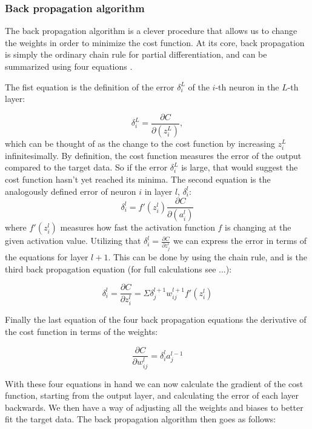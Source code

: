 \documentclass[a4paper, UKenglish, 11pt]{uiomaster}
\begin{document}
\subsubsection{Back propagation algorithm}
The back propagation algorithm is a clever procedure that allows us to change the weights in order to minimize the cost function. At its core, back propagation is simply the ordinary chain rule for partial differentiation, and can be summarized using four equations \cite{mehta2019high}.

The fist equation is the definition of the error $\delta_i^L$ of the $i$-th neuron in the $L$-th layer:

\begin{equation}
    \delta_i^L = \frac{\partial C}{\partial(z_i^L)},
\label{eq:I}
\end{equation}
which can be thought of as the change to the cost function by increasing $z_i^L$ infinitesimally. By definition, the cost function measures the error of the output compared to the target data. So if the error $\delta_i^L$ is large, that would suggest the cost function hasn't yet reached its minima.
The second equation is the analogously defined error of neuron $i$ in layer $l$, $\delta_i^l$:
\begin{equation}
    \delta_i^l = f'(z_i^l)\frac{\partial C}{\partial(a_i^l)}
\label{eq:II}
\end{equation}
where $f'(z_i^l)$ measures how fast the activation function $f$ is changing at the given activation value.
Utilizing that $\delta_i^l = \frac{\partial C}{\partial z_j^l}$ we can express the error in terms of the equations for layer $l+1$. This can be done by using the chain rule, and is the third back propagation equation (for full calculations see ...):

\begin{equation}
    \delta_i^l = \frac{\partial C}{\partial z^l_{i}} = \Sigma \delta_j^{l+1}w_{ij}^{l+1}f'(z_i^l)
\label{eq:III}
\end{equation}

Finally the last equation of the four back propagation equations the derivative of the cost function in terms of the weights:

\begin{equation}
    \frac{\partial C}{\partial w^l_{ij}} = \delta_i^l a_j^{l-1}
\label{eq:IV}
\end{equation}

With these four equations in hand we can now calculate the gradient of the cost function, starting from the output layer, and calculating the error of each layer backwards. We then have a way of adjusting all the weights and biases to better fit the target data. The back propagation algorithm then goes as follows:
\end{document}
